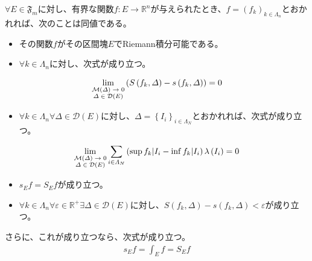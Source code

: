 \documentclass[dvipdfmx]{jsarticle}
\begin{document}
\begin{thm}\label{4.6.5.13}
$\forall E \in \mathfrak{F}_{m}$に対し、有界な関数$f:E \rightarrow \mathbb{R}^{n}$が与えられたとき、$f = \left( f_{k} \right)_{k \in \varLambda_{n}}$とおかれれば、次のことは同値である。
\begin{itemize}
\item
  その関数$f$がその区間塊$E$でRiemann積分可能である。
\item
  $\forall k \in \varLambda_{n}$に対し、次式が成り立つ。
\end{itemize}
\begin{align*}
\lim_{\scriptsize \begin{matrix}
\mathcal{M}(\varDelta) \rightarrow 0 \\
\varDelta \in \mathcal{D}(E) \\
\end{matrix}}\left( S\left( f_{k},\varDelta \right) - s\left( f_{k},\varDelta \right) \right) = 0
\end{align*}
\begin{itemize}
\item
  $\forall k \in \varLambda_{n}\forall\varDelta \in \mathcal{D}(E)$に対し、$\varDelta = \left\{ I_{i} \right\}_{i \in \varLambda_{N}}$とおかれれば、次式が成り立つ。
\end{itemize}
\begin{align*}
\lim_{\scriptsize \begin{matrix}
\mathcal{M}(\varDelta) \rightarrow 0 \\
\varDelta \in \mathcal{D}(E) \\
\end{matrix}}{\sum_{i \in \varLambda_{N}} {\left( \sup{f_{k}|I_{i}} - \inf{f_{k}|I_{i}} \right)\lambda\left( I_{i} \right)}} = 0
\end{align*}
\begin{itemize}
\item
  $s_{E}f = S_{E}f$が成り立つ。
\item
  $\forall k \in \varLambda_{n}\forall\varepsilon \in \mathbb{R}^{+}\exists\varDelta \in \mathcal{D}(E)$に対し、$S\left( f_{k},\varDelta \right) - s\left( f_{k},\varDelta \right) < \varepsilon$が成り立つ。
\end{itemize}
さらに、これが成り立つなら、次式が成り立つ。
\begin{align*}
s_{E}f = \int_{E} f = S_{E}f
\end{align*}
\end{thm}
\end{document}
